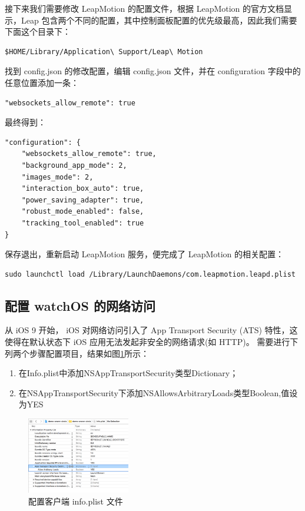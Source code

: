 接下来我们需要修改 LeapMotion 的配置文件，根据 LeapMotion 的官方文档显示，Leap 包含两个不同的配置，其中控制面板配置的优先级最高，因此我们需要下面这个目录下：
\begin{lstlisting}[frame=trBL,frameround=fttt,rulesepcolor=\color{White},numbers=none]
$HOME/Library/Application\ Support/Leap\ Motion
\end{lstlisting}

找到 config.json 的修改配置，编辑 config.json 文件，并在 configuration 字段中的任意位置添加一条：
\begin{lstlisting}[frame=trBL,frameround=fttt,rulesepcolor=\color{White},numbers=none]
"websockets_allow_remote": true
\end{lstlisting}

最终得到：

\begin{lstlisting}[frame=trBL,frameround=fttt,rulesepcolor=\color{White},numbers=none]
"configuration": {
    "websockets_allow_remote": true,
    "background_app_mode": 2,
    "images_mode": 2,
    "interaction_box_auto": true,
    "power_saving_adapter": true,
    "robust_mode_enabled": false,
    "tracking_tool_enabled": true
}
\end{lstlisting}

保存退出，重新启动 LeapMotion 服务，便完成了 LeapMotion 的相关配置：

\begin{lstlisting}[frame=trBL,frameround=fttt,rulesepcolor=\color{White},numbers=none]
sudo launchctl load /Library/LaunchDaemons/com.leapmotion.leapd.plist
\end{lstlisting}

\subsection{配置 watchOS 的网络访问}

从 iOS 9 开始， iOS 对网络访问引入了 App Transport Security (ATS) 特性，这使得在默认状态下 iOS 应用无法发起非安全的网络请求(如 HTTP)。
需要进行下列两个步骤配置项目，结果如图\ref{fig:config}所示：

\begin{enumerate}
    \item 在Info.plist中添加NSAppTransportSecurity类型Dictionary；
    \item 在NSAppTransportSecurity下添加NSAllowsArbitraryLoads类型Boolean,值设为YES
\end{enumerate}

\begin{figure}[H]
    \kaishu
    \centering
    \includegraphics[width=0.4\textwidth]{figures/config}
    \caption{\kaishu 配置客户端 info.plist 文件}
    \label{fig:config}
\end{figure}

